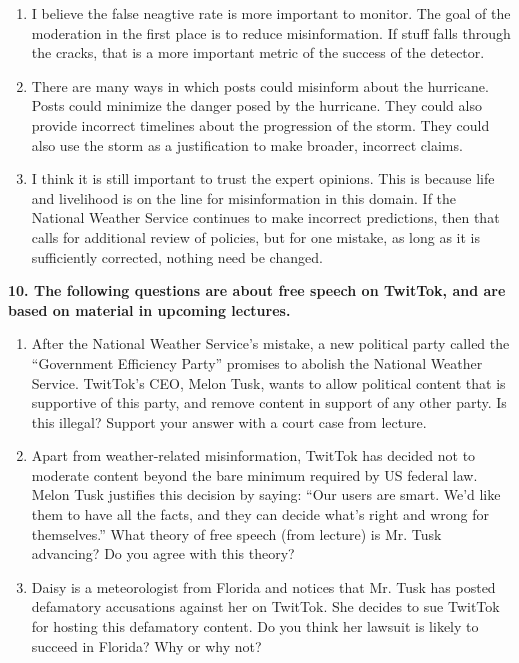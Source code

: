 \documentclass{article}
\begin{document}
\bigskip
\begin{mdframed}
\begin{enumerate}[label=\Alph*.]
\item I believe the false neagtive rate is more important to monitor. The goal of the moderation in the first place is to reduce misinformation. If stuff falls through the cracks, that is a more important metric of the success of the detector. 
\item There are many ways in which posts could misinform about the hurricane. Posts could minimize the danger posed by the hurricane. They could also provide incorrect timelines about the progression of the storm. They could also use the storm as a justification to make broader, incorrect claims. 
\item I think it is still important to trust the expert opinions. This is because life and livelihood is on the line for misinformation in this domain. If the National Weather Service continues to make incorrect predictions, then that calls for additional review of policies, but for one mistake, as long as it is sufficiently corrected, nothing need be changed.
\end{enumerate}
\end{mdframed}
\bigskip


\textbf{10. The following questions are about free speech on TwitTok, and are based on material in upcoming lectures.}
\begin{enumerate}[label=\Alph*.]
\item After the National Weather Service's mistake, a new political party called the ``Government Efficiency Party'' promises to abolish the National Weather Service. TwitTok's CEO, Melon Tusk, wants to allow political content that is supportive of this party, and remove content in support of any other party. Is this illegal? Support your answer with a court case from lecture. 
\item Apart from weather-related misinformation, TwitTok has decided not to moderate content beyond the bare minimum required by US federal law. Melon Tusk justifies this decision by saying: ``Our users are smart. We'd like them to have all the facts, and they can decide what's right and wrong for themselves.'' What theory of free speech (from lecture) is Mr. Tusk advancing? Do you agree with this theory?
\item Daisy is a meteorologist from Florida and notices that Mr. Tusk has posted defamatory accusations against her on TwitTok. She decides to sue TwitTok for hosting this defamatory content. Do you think her lawsuit is likely to succeed in Florida? Why or why not?
\end{enumerate}
\end{document}
